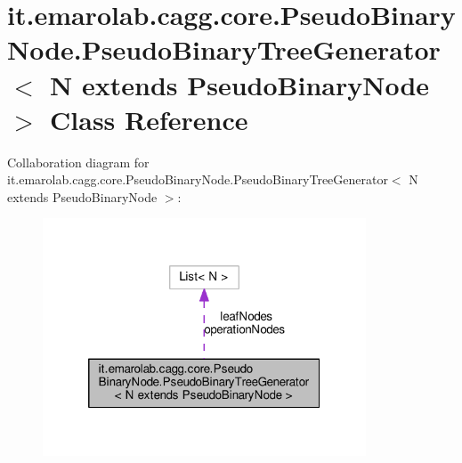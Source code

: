 \hypertarget{classit_1_1emarolab_1_1cagg_1_1core_1_1PseudoBinaryNode_1_1PseudoBinaryTreeGenerator_3_01N_01extends_01PseudoBinaryNode_01_4}{\section{it.\-emarolab.\-cagg.\-core.\-Pseudo\-Binary\-Node.\-Pseudo\-Binary\-Tree\-Generator$<$ N extends Pseudo\-Binary\-Node $>$ Class Reference}
\label{classit_1_1emarolab_1_1cagg_1_1core_1_1PseudoBinaryNode_1_1PseudoBinaryTreeGenerator_3_01N_01extends_01PseudoBinaryNode_01_4}
}


Collaboration diagram for it.\-emarolab.\-cagg.\-core.\-Pseudo\-Binary\-Node.\-Pseudo\-Binary\-Tree\-Generator$<$ N extends Pseudo\-Binary\-Node $>$\-:\nopagebreak
\begin{figure}[H]
\begin{center}
\leavevmode
\includegraphics[width=272pt]{classit_1_1emarolab_1_1cagg_1_1core_1_1PseudoBinaryNode_1_1PseudoBinaryTreeGenerator_3_01N_01ext10a7d75cd85f13167cfcb46b6895fe82}
\end{center}
\end{figure}
